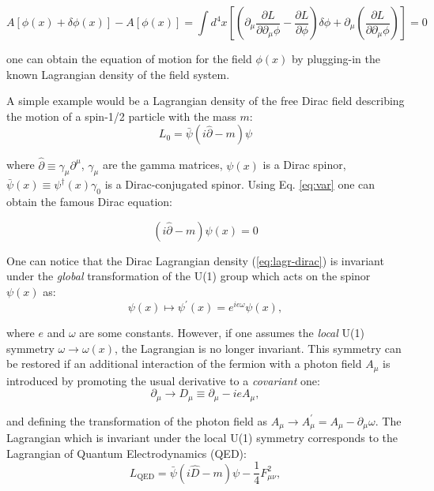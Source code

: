 \begin{equation}\label{eq:var}
    A[\phi(x) + \delta\phi(x)] - A[\phi(x)] = \int d^4x \left[\left(\partial_\mu\dfrac{\partial L}{\partial\partial_\mu\phi} - \dfrac{\partial L}{\partial \phi}\right)\delta\phi + \partial_\mu\left(\dfrac{\partial L}{\partial\partial_\mu\phi}\right)\right] = 0
\end{equation}

one can obtain the equation of motion for the field $\phi(x)$ by plugging-in the known Lagrangian density of the field system.

A simple example would be a Lagrangian density of the free Dirac field describing the motion of a spin-1/2 particle with the mass $m$:
\begin{equation}\label{eq:lagr-dirac}
    L_0 = \bar{\psi}(i\hat{\partial} - m)\psi
\end{equation}

where $\hat{\partial} \equiv \gamma_\mu\partial^\mu$, $\gamma_\mu$ are the gamma matrices, $\psi(x)$ is a Dirac spinor, $\bar{\psi}(x) \equiv \psi^\dag(x)\gamma_0$ is a Dirac-conjugated spinor. Using Eq. \ref{eq:var} one can obtain the famous Dirac equation:

\begin{equation}
    (i\hat{\partial} - m)\psi(x) = 0
\end{equation}

One can notice that the Dirac Lagrangian density (\ref{eq:lagr-dirac}) is invariant under the \textit{global} transformation of the U(1) group which acts on the spinor $\psi(x)$ as:
\begin{equation}
    \psi(x) \mapsto \psi^\prime(x) = e^{ie\omega} \psi(x),
\end{equation}

where $e$ and $\omega$ are some constants. However, if one assumes the \textit{local} U(1) symmetry $\omega \to \omega(x)$, the Lagrangian is no longer invariant. This symmetry can be restored if an additional interaction of the fermion with a photon field $A_\mu$ is introduced by promoting the usual derivative to a \textit{covariant} one:
\begin{equation}
    \partial_\mu \to D_\mu \equiv \partial_\mu -ieA_\mu,
\end{equation}

and defining the transformation of the photon field as $A_\mu \to A^\prime_\mu = A_\mu - \partial_\mu\omega$. The Lagrangian which is invariant under the local U(1) symmetry corresponds to the Lagrangian of Quantum Electrodynamics (QED):
\begin{equation}\label{eq:lagr-qed}
    L_\text{QED} = \bar{\psi}(i\hat{D} - m)\psi -\dfrac{1}{4}F^2_{\mu\nu},
\end{equation}

